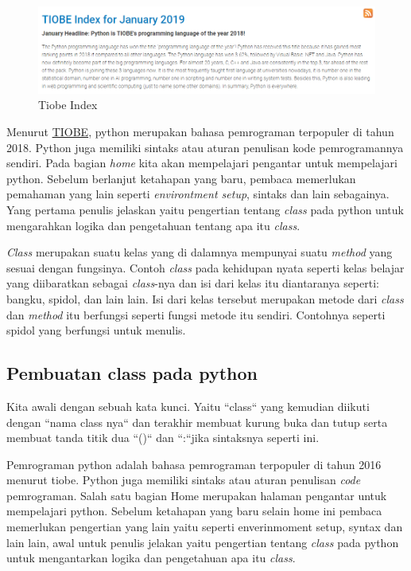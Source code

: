 \begin{figure}[!htbp]
\centerline{\includegraphics[width=75\textwidth]{figures/tiobe.PNG}}
\caption{Tiobe Index}
\label{tiobe}
\end{figure}
Menurut \href{https://www.tiobe.com/tiobe-index/}{TIOBE}, python merupakan bahasa pemrograman terpopuler di tahun 2018. Python juga memiliki sintaks atau aturan penulisan kode pemrogramannya sendiri. Pada bagian \textit{home} kita akan mempelajari pengantar untuk mempelajari python. Sebelum berlanjut ketahapan yang baru, pembaca memerlukan pemahaman yang lain seperti \textit{environtment setup}, sintaks dan lain sebagainya. Yang pertama penulis jelaskan yaitu pengertian tentang \textit{class} pada python untuk mengarahkan logika dan pengetahuan tentang apa itu \textit{class}.

\textit{Class} merupakan suatu kelas yang di dalamnya mempunyai suatu \textit{method} yang sesuai dengan fungsinya. Contoh \textit{class} pada kehidupan nyata seperti kelas belajar yang diibaratkan sebagai \textit{class}-nya dan isi dari kelas itu diantaranya seperti: bangku, spidol, dan lain lain. Isi dari kelas tersebut merupakan metode dari \textit{class} dan \textit{method} itu berfungsi seperti fungsi metode itu sendiri. Contohnya seperti spidol yang berfungsi untuk menulis.
\subsection{Pembuatan class pada python}
Kita awali dengan sebuah kata kunci. Yaitu  ``class`` yang kemudian diikuti dengan ``nama class nya`` dan terakhir membuat kurung buka dan tutup serta membuat tanda titik dua  ``()`` dan ``:``jika sintaksnya seperti ini.


Pemrograman python adalah bahasa pemrograman terpopuler di tahun 2016 menurut tiobe. Python juga memiliki sintaks atau aturan penulisan \textit{code} pemrograman. Salah satu bagian Home merupakan halaman pengantar untuk mempelajari python. Sebelum ketahapan yang baru selain home ini pembaca memerlukan pengertian yang lain yaitu seperti enverinmoment setup, syntax dan lain lain, awal untuk penulis jelakan yaitu pengertian tentang \textit{class} pada python untuk mengantarkan logika dan pengetahuan apa itu \textit{class}.

